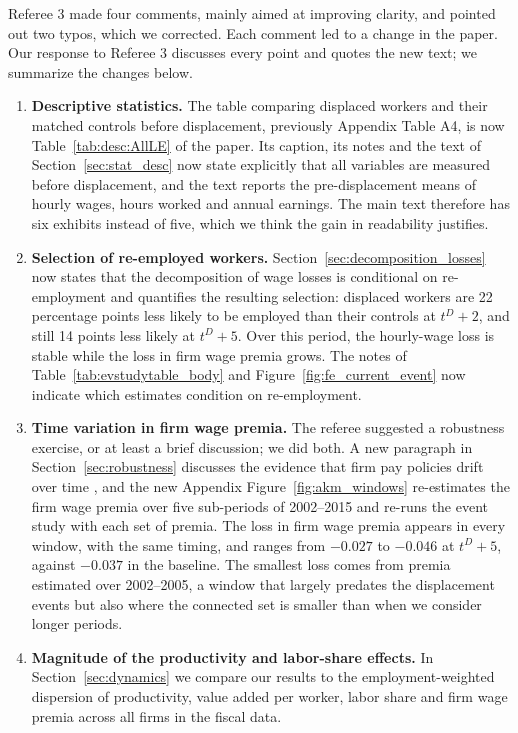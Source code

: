 \documentclass[11pt]{article}
\newcommand{\answer}[1]{\begingroup\color{navy}#1\endgroup}
\begin{document}
\answer{Referee 3 made four comments, mainly aimed at improving clarity, and pointed out two typos, which we corrected. Each comment led to a change in the paper. Our response to Referee 3 discusses every point and quotes the new text; we summarize the changes below.

\begin{enumerate}[leftmargin=*]
\item \textbf{Descriptive statistics.} The table comparing displaced workers and their matched controls before displacement, previously Appendix Table A4, is now Table~\ref{tab:desc:AllLE} of the paper. Its caption, its notes and the text of Section~\ref{sec:stat_desc} now state explicitly that all variables are measured before displacement, and the text reports the pre-displacement means of hourly wages, hours worked and annual earnings. The main text therefore has six exhibits instead of five, which we think the gain in readability justifies.

\item \textbf{Selection of re-employed workers.} Section~\ref{sec:decomposition_losses} now states that the decomposition of wage losses is conditional on re-employment and quantifies the resulting selection: displaced workers are 22 percentage points less likely to be employed than their controls at $t^D+2$, and still 14 points less likely at $t^D+5$. Over this period, the hourly-wage loss is stable while the loss in firm wage premia grows. The notes of Table~\ref{tab:evstudytable_body} and Figure~\ref{fig:fe_current_event} now indicate which estimates condition on re-employment.

\item \textbf{Time variation in firm wage premia.} The referee suggested a robustness exercise, or at least a brief discussion; we did both. A new paragraph in Section~\ref{sec:robustness} discusses the evidence that firm pay policies drift over time \citep{lachowska2023drift,engbom2023firmpay}, and the new Appendix Figure~\ref{fig:akm_windows} re-estimates the firm wage premia over five sub-periods of 2002--2015 and re-runs the event study with each set of premia. The loss in firm wage premia appears in every window, with the same timing, and ranges from $-0.027$ to $-0.046$ at $t^D+5$, against $-0.037$ in the baseline. The smallest loss comes from premia estimated over 2002--2005, a window that largely predates the displacement events but also where the connected set is smaller than when we consider longer periods.

\item \textbf{Magnitude of the productivity and labor-share effects.} In Section~\ref{sec:dynamics} we compare our results to the employment-weighted dispersion of productivity, value added per worker, labor share and firm wage premia across all firms in the fiscal data. 



\end{enumerate}}
\end{document}
